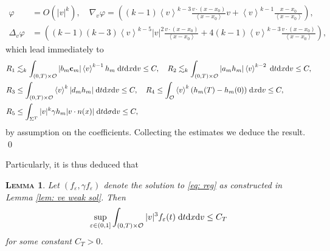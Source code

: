 \documentclass[10pt, reqno]{amsart}
\theoremstyle{plain}
\newtheorem{lemma}[theorem]{\normalfont \scshape Lemma}
\theoremstyle{definition}
\theoremstyle{remark}
\renewenvironment{proof}[1][\proofname]{\noindent{\scshape #1.\quad}}{\qed}
\numberwithin{equation}{section}
\newcommand{\bfc}{{\bf c}}
\newcommand{\calO}{\mathcal O}
\newcommand{\ve}{\varepsilon}
\newcommand{\dx}{\textnormal{d}x}
\newcommand{\dv}{\textnormal{d}v}
\newcommand{\dt}{\textnormal{d}t}
\newcommand{\tnd}{\textnormal{d}}
\newcommand{\lt}{\left}
\newcommand{\rt}{\right}
\begin{document}
\begin{proof}
\begin{align*}
        \varphi &= O(|v|^k), \quad  \nabla_v\varphi  = \left( (k-1) \lt<v \rt>^{k-3} \frac{v\cdot (x-x_0)}{\lt<x-x_0\rt>} v + \lt<v\rt>^{k-1} \frac{x-x_0}{\lt<x-x_0\rt>} \right) ,\\
        \Delta_v \varphi &= \left((k-1)(k-3)\left<v\right>^{k-5}|v|^2 \frac{v\cdot (x-x_0)}{\left<x-x_0\right>} + 4(k-1) \left<v\right>^{k-3} \frac{v\cdot (x-x_0)}{\left<x-x_0\right>} \right) ,
    \end{align*}
which lead immediately to
\begin{align*}
    &R_1 \lesssim_k \int_{(0,T)\times\calO} |b_m \bfc_m| \lt<v\rt>^{k-1} h_m \;\dt\dx\dv \le C, \quad R_2 \lesssim_k \int_{(0,T)\times \calO} |a_m h_m| \lt<v\rt>^{k-2} \;\dt\dx\dv \le C,\\
    &R_3 \le \int_{(0,T)\times \calO} \lt<v\rt>^k |d_m h_m| \;\dt\dx\dv \le C,  \quad R_4 \le \int_{\calO} \lt<v\rt>^k (h_m(T) - h_m(0)) \; \dx\dv \le C, \\
    &R_5 \le \int_{\Sigma^T} |v|^k \gamma h_m |v\cdot n(x)| \; \dt\tnd\sigma\dv \le C,
\end{align*}
by assumption on the coefficients. Collecting the estimates we deduce the result.
\end{proof}


Particularly, it is thus deduced that

\begin{lemma}\label{lem: ve higher moments}
    Let $(f_\ve,\gamma f_\ve)$ denote the solution to \eqref{eq: reg} as constructed in Lemma \ref{lem: ve weak sol}. Then
    \begin{align*}
        \sup_{\ve \in (0,1]} \int_{(0,T)\times \calO} |v|^3 f_\ve(t) \;\dt\dx\dv \le C_T
    \end{align*}
    for some constant $C_T>0$.
\end{lemma}
\end{document}
